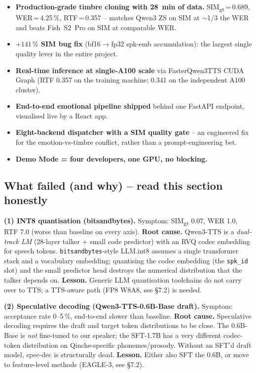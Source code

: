 \documentclass[10pt,a4paper]{article}
\begin{document}
\begin{successbox}\small
\begin{itemize}
  \item \textbf{Production-grade timbre cloning with 28~min of data.}
        SIM\textsubscript{gt}\,=\,0.689, WER\,=\,4.25\,\%, RTF\,=\,0.357 -- matches
        Qwen3 ZS on SIM at $\sim$1/3 the WER and beats Fish~S2~Pro on SIM
        at comparable WER.
  \item \textbf{$+141\,\%$ SIM bug fix} (bf16$\to$fp32 spk-emb accumulation):
        the largest single quality lever in the entire project.
  \item \textbf{Real-time inference at single-A100 scale} via FasterQwen3TTS
        CUDA Graph (RTF 0.357 on the training machine; 0.341 on the
        independent A100 cluster).
  \item \textbf{End-to-end emotional pipeline shipped} behind one FastAPI
        endpoint, visualised live by a React app.
  \item \textbf{Eight-backend dispatcher with a SIM quality gate} -- an
        engineered fix for the emotion-vs-timbre conflict, rather than a
        prompt-engineering bet.
  \item \textbf{Demo Mode = four developers, one GPU, no blocking.}
\end{itemize}
\end{successbox}

\subsection{What failed (and why) -- read this section honestly}

\noindent\textbf{(1) INT8 quantisation (bitsandbytes).}
Symptom: SIM\textsubscript{gt} 0.07, WER 1.0, RTF 7.0 (worse than baseline
on every axis). \textbf{Root cause.} Qwen3-TTS is a \emph{dual-track LM}
(28-layer talker + small code predictor) with an RVQ codec embedding for
speech tokens. \texttt{bitsandbytes}-style LLM.int8 assumes a single
transformer stack and a vocabulary embedding; quantising the codec
embedding (the \texttt{spk\_id} slot) and the small predictor head
destroys the numerical distribution that the talker depends on.
\textbf{Lesson.} Generic LLM quantisation toolchains do not carry over
to TTS; a TTS-aware path (FP8 W8A8, see \S7.2) is needed.

\noindent\textbf{(2) Speculative decoding (Qwen3-TTS-0.6B-Base draft).}
Symptom: acceptance rate 0--5\,\%, end-to-end slower than baseline.
\textbf{Root cause.} Speculative decoding requires the draft and target
token distributions to be close. The 0.6B-Base is \emph{not} fine-tuned
to our speaker; the SFT-1.7B has a very different codec-token distribution
on Qinche-specific phonemes/prosody. Without an SFT'd draft model,
spec-dec is structurally dead. \textbf{Lesson.} Either also SFT the 0.6B,
or move to feature-level methods (EAGLE-3, see \S7.2).
\end{document}
